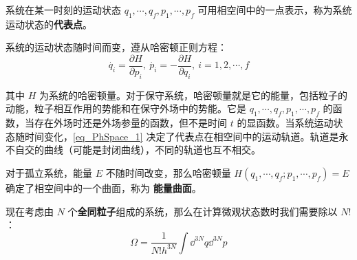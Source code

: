 系统在某一时刻的运动状态 $q_1,\cdots,q_f,p_1,\cdots,p_f$ 可用相空间中的一点表示，称为系统运动状态的\textbf{代表点}。

系统的运动状态随时间而变，遵从哈密顿正则方程：
\begin{equation}\label{eq_PhSpace_1}
\dot{q_i}=\frac{\partial H}{\partial p_i},\ \dot{p_i}=-\frac{\partial H}{\partial q_i},\ i=1,2,\cdots,f
\end{equation}

其中 $H$ 为系统的哈密顿量。对于保守系统，哈密顿量就是它的能量，包括粒子的动能，粒子相互作用的势能和在保守外场中的势能。它是 $q_1,\cdots,q_f,p_1,\cdots,p_f$ 的函数，当存在外场时还是外场参量的函数，但不是时间 $t$ 的显函数。当系统运动状态随时间变化，\autoref{eq_PhSpace_1} 决定了代表点在相空间中的运动轨道。轨道是永不自交的曲线（可能是封闭曲线），不同的轨道也互不相交。

对于孤立系统，能量 $E$ 不随时间改变，那么哈密顿量 $H(q_1,\cdots,q_f;p_1,\cdots,p_f)=E$ 确定了相空间中的一个曲面，称为 \textbf{能量曲面}。

现在考虑由 $N$ 个\textbf{全同粒子}组成的系统，那么在计算微观状态数时我们需要除以 $N!$：
\begin{equation}
\Omega =\frac{1}{N!h^{3N}} \int {\dd}^{3N} q {\dd}^{3N} p 
\end{equation}